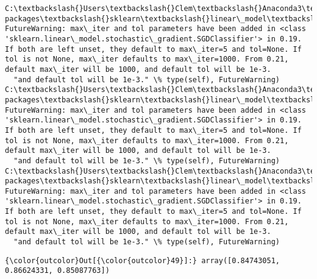 \documentclass[11pt]{article}
\begin{document}
    \begin{Verbatim}[commandchars=\\\{\}]
C:\textbackslash{}Users\textbackslash{}Clem\textbackslash{}Anaconda3\textbackslash{}lib\textbackslash{}site-packages\textbackslash{}sklearn\textbackslash{}linear\_model\textbackslash{}stochastic\_gradient.py:128: FutureWarning: max\_iter and tol parameters have been added in <class 'sklearn.linear\_model.stochastic\_gradient.SGDClassifier'> in 0.19. If both are left unset, they default to max\_iter=5 and tol=None. If tol is not None, max\_iter defaults to max\_iter=1000. From 0.21, default max\_iter will be 1000, and default tol will be 1e-3.
  "and default tol will be 1e-3." \% type(self), FutureWarning)
C:\textbackslash{}Users\textbackslash{}Clem\textbackslash{}Anaconda3\textbackslash{}lib\textbackslash{}site-packages\textbackslash{}sklearn\textbackslash{}linear\_model\textbackslash{}stochastic\_gradient.py:128: FutureWarning: max\_iter and tol parameters have been added in <class 'sklearn.linear\_model.stochastic\_gradient.SGDClassifier'> in 0.19. If both are left unset, they default to max\_iter=5 and tol=None. If tol is not None, max\_iter defaults to max\_iter=1000. From 0.21, default max\_iter will be 1000, and default tol will be 1e-3.
  "and default tol will be 1e-3." \% type(self), FutureWarning)
C:\textbackslash{}Users\textbackslash{}Clem\textbackslash{}Anaconda3\textbackslash{}lib\textbackslash{}site-packages\textbackslash{}sklearn\textbackslash{}linear\_model\textbackslash{}stochastic\_gradient.py:128: FutureWarning: max\_iter and tol parameters have been added in <class 'sklearn.linear\_model.stochastic\_gradient.SGDClassifier'> in 0.19. If both are left unset, they default to max\_iter=5 and tol=None. If tol is not None, max\_iter defaults to max\_iter=1000. From 0.21, default max\_iter will be 1000, and default tol will be 1e-3.
  "and default tol will be 1e-3." \% type(self), FutureWarning)

    \end{Verbatim}

\begin{Verbatim}[commandchars=\\\{\}]
{\color{outcolor}Out[{\color{outcolor}49}]:} array([0.84743051, 0.86624331, 0.85087763])
\end{Verbatim}
            
\end{document}
